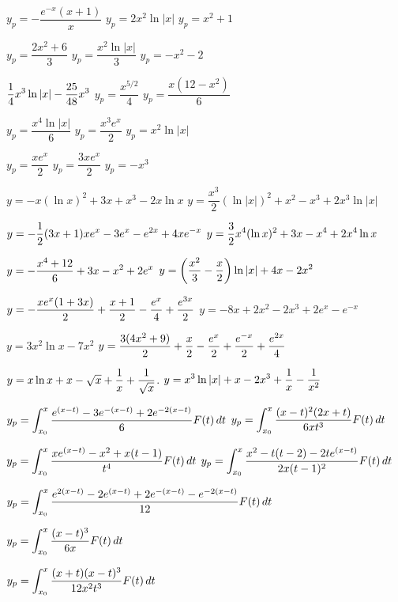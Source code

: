  $y_p=-\dfrac{e^{-x}(x+1)}{x}$
 $y_p=2x^2\ln|x|$
 $y_p=x^2+1$

 $y_p=\dfrac{2x^2+6}{3}$
 $y_p=\dfrac{x^2\ln|x|}{3}$
 $y_p=-x^2-2$

  $\displaystyle{\frac{1}{4} x^3
\ln |x|-\frac{25}{48}x^3}$
 $y_p=\dfrac{x^{5/2}}{4}$
 $y_p=\dfrac{x(12-x^2)}{6}$

 $y_p=\dfrac{x^4\ln|x|}{6}$
 $y_p=\dfrac{x^3e^x}{2}$
 $y_p= x^2\ln|x|$

 $y_p=\dfrac{xe^x}{2}$
 $y_p=\dfrac{3xe^x}{2}$
  $y_p=-x^3$

 $y=-x(\ln x)^2+3x+x^3-2x\ln x$
 $y=\dfrac{x^3}{2} (\ln
|x|)^2+x^2-x^3+2x^3\ln|x|$

   $y=\displaystyle{-\frac{1}{2}(3x+1)xe^x-3e^x-e^{2x}
+4xe^{-x}}$
 $y=\displaystyle{\frac{3}{2}x^4(\ln
x)^2+3x-x^4+2x^4\ln x}$

 $y=\displaystyle{-\frac{x^4+12}{6}+3x-x^2+2e^x}$
$y=\displaystyle{\left(\frac{x^2}{3}-\frac{x}{2}\right)\ln|x|+4x-2x^2}$

$y=\displaystyle-\frac{xe^x(1+3x)}{2}+\frac{x+1}{2}-\frac{e^x}{4}+\frac{e^{3x}}{2}$
 $y=-8x+2x^2-2x^3+2e^x-e^{-x}$

 $y=3x^2\ln x-7x^2$
$y=\displaystyle{\frac{3(4x^2+9)}{2}+\frac{x}{2}-\frac{e^x}{2}+\frac{e^{-x}}{2}+\frac{e^{2x}}{4}}$

$y=x\ln x+x-\sqrt x+\displaystyle\frac{1}{x}+\frac{1}{\sqrt x}$.
  $y=\displaystyle{x^3\ln|x|+x-2x^3+\frac{1}{x}-\frac{1}{x^2}}$

$y_p=\displaystyle{\int_{x_0}^x\frac{e^{(x-t)}-3e^{-(x-t)}+2e^{-2(x-t)}}{6}
F(t)\,dt}$
$y_p=\displaystyle{\int_{x_0}^x\frac{(x-t)^2(2x+t)}{6xt^3}
F(t)\,dt}$

$y_p=\displaystyle{\int_{x_0}^x\frac{xe^{(x-t)}-x^2+x(t-1)}{t^4}
F(t)\,dt}$
$y_p=\displaystyle{\int_{x_0}^x\frac{x^2-t(t-2)-2te^{(x-t)}}{2x(t-1)^2}
F(t)\,dt}$

$y_p=\displaystyle{\int_{x_0}^x
\frac{e^{2(x-t)}-2e^{(x-t)}+2e^{-(x-t)}-e^{-2(x-t)}}{12} F(t)\,dt}$

$y_p=\displaystyle{\int_{x_0}^x\frac{(x-t)^3}{6x}
F(t)\,dt}$

$y_p=\displaystyle\int_{x_0}^x\frac{(x+t)(x-t)^3}{12x^2t^3}F(t)\,dt$

